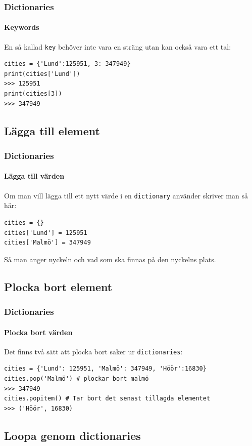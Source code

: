 \documentclass[aspectratio=169]{beamer}
\begin{document}
\begin{frame}[fragile]
\frametitle{Dictionaries}
\framesubtitle{Keywords}

En så kallad \lstinline{key} behöver inte vara en sträng utan kan också vara ett tal:

\begin{lstlisting}
cities = {'Lund':125951, 3: 347949}
print(cities['Lund'])
>>> 125951
print(cities[3])
>>> 347949
\end{lstlisting}

\end{frame}

\subsection{Lägga till element}

\begin{frame}[fragile]
\frametitle{Dictionaries}
\framesubtitle{Lägga till värden}

Om man vill lägga till ett nytt värde i en \lstinline{dictionary} använder skriver man så här:

\begin{lstlisting}
cities = {}
cities['Lund'] = 125951
cities['Malmö'] = 347949
\end{lstlisting}

Så man anger nyckeln och vad som ska finnas på den nyckelns plats.

\end{frame}

\subsection{Plocka bort element}

\begin{frame}[fragile]
\frametitle{Dictionaries}
\framesubtitle{Plocka bort värden}

Det finns två sätt att plocka bort saker ur \lstinline{dictionaries}:

\begin{lstlisting}
cities = {'Lund': 125951, 'Malmö': 347949, 'Höör':16830}
cities.pop('Malmö') # plockar bort malmö
>>> 347949
cities.popitem() # Tar bort det senast tillagda elementet
>>> ('Höör', 16830)
\end{lstlisting}

\end{frame}

\subsection{Loopa genom dictionaries}
\end{document}
